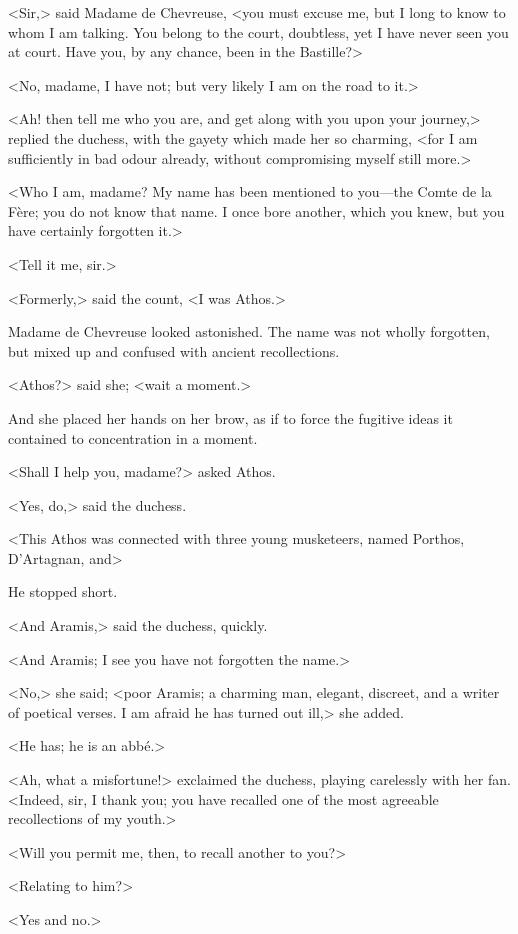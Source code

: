 <Sir,> said Madame de Chevreuse, <you must excuse me, but I long to know to whom I am talking. You belong to the court, doubtless, yet I have never seen you at court. Have you, by any chance, been in the Bastille?>

<No, madame, I have not; but very likely I am on the road to it.>

<Ah! then tell me who you are, and get along with you upon your journey,> replied the duchess, with the gayety which made her so charming, <for I am sufficiently in bad odour already, without compromising myself still more.>

<Who I am, madame? My name has been mentioned to you—the Comte de la Fère; you do not know that name. I once bore another, which you knew, but you have certainly forgotten it.>

<Tell it me, sir.>

<Formerly,> said the count, <I was Athos.>

Madame de Chevreuse looked astonished. The name was not wholly forgotten, but mixed up and confused with ancient recollections.

<Athos?> said she; <wait a moment.>

And she placed her hands on her brow, as if to force the fugitive ideas it contained to concentration in a moment.

<Shall I help you, madame?> asked Athos.

<Yes, do,> said the duchess.

<This Athos was connected with three young musketeers, named Porthos, D'Artagnan, and\longdash>

He stopped short.

<And Aramis,> said the duchess, quickly.

<And Aramis; I see you have not forgotten the name.>

<No,> she said; <poor Aramis; a charming man, elegant, discreet, and a writer of poetical verses. I am afraid he has turned out ill,> she added.

<He has; he is an abbé.>

<Ah, what a misfortune!> exclaimed the duchess, playing carelessly with her fan. <Indeed, sir, I thank you; you have recalled one of the most agreeable recollections of my youth.>

<Will you permit me, then, to recall another to you?>

<Relating to him?>

<Yes and no.>

